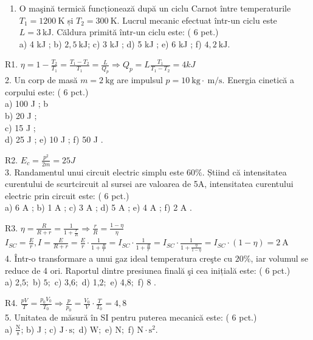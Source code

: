 \begin{enumerate}
  \item O maşină termică funcționează după un ciclu Carnot între temperaturile $T_{1}=1200 \mathrm{~K}$ și $T_{2}=300 \mathrm{~K}$. Lucrul mecanic efectuat într-un ciclu este $L=3 \mathrm{~kJ}$. Căldura primită într-un ciclu este: ( 6 pet.)\\
a) 4 kJ ; b) $2,5 \mathrm{~kJ}$; c) 3 kJ ; d) 5 kJ ; e) 6 kJ ; f) $4,2 \mathrm{~kJ}$.
\end{enumerate}

R1. $\eta=1-\frac{T_{2}}{T_{1}}=\frac{T_{1}-T_{2}}{T_{1}}=\frac{L}{Q_{p}} \Rightarrow Q_{p}=L \frac{T_{1}}{T_{1}-T_{2}}=4 k J$\\
2. Un corp de masă $m=2 \mathrm{~kg}$ are impulsul $p=10 \mathrm{~kg} \cdot \mathrm{~m} / \mathrm{s}$. Energia cinetică a corpului este: ( 6 pct.)\\
a) 100 J ; b\\
b) 20 J ;\\
c) 15 J ;\\
d) 25 J ; e) 10 J ; f) 50 J .

R2. $E_{c}=\frac{p^{2}}{2 m}=25 J$\\
3. Randamentul unui circuit electric simplu este $60 \%$. Știind că intensitatea curentului de scurtcircuit al sursei are valoarea de 5A, intensitatea curentului electric prin circuit este: ( 6 pct.)\\
a) 6 A ; b) 1 A ; c) 3 A ; d) 5 A ; e) 4 A ; f) 2 A .

R3. $\eta=\frac{R}{R+r}=\frac{1}{1+\frac{r}{R}} \Rightarrow \frac{r}{R}=\frac{1-\eta}{\eta}$\\
$I_{S C}=\frac{E}{r}, I=\frac{E}{R+r}=\frac{E}{r} \cdot \frac{1}{1+\frac{R}{r}}=I_{S C} \cdot \frac{1}{1+\frac{R}{r}}=I_{S C} \cdot \frac{1}{1+\frac{\eta}{1-\eta}}=I_{S C} \cdot(1-\eta)=2 \mathrm{~A}$\\
4. Într-o transformare a unui gaz ideal temperatura creşte cu $20 \%$, iar volumul se reduce de 4 ori. Raportul dintre presiunea finală şi cea inițială este: ( 6 pct.)\\
a) 2,$5 ;$ b) $5 ;$ c) 3,$6 ;$ d) 1,$2 ;$ e) 4,$8 ;$ f) 8 .

R4. $\frac{p V}{T}=\frac{p_{0} V_{0}}{T_{0}} \Rightarrow \frac{p}{p_{0}}=\frac{V_{0}}{V} \cdot \frac{T}{T_{0}}=4,8$\\
5. Unitatea de măsură în SI pentru puterea mecanică este: ( 6 pct.)\\
a) $\frac{\mathrm{N}}{\mathrm{s}}$; b) J ; c) $\mathrm{J} \cdot \mathrm{s} ;$ d) $\mathrm{W} ;$ e) $\mathrm{N} ;$ f) $\mathrm{N} \cdot \mathrm{s}^{2}$.

